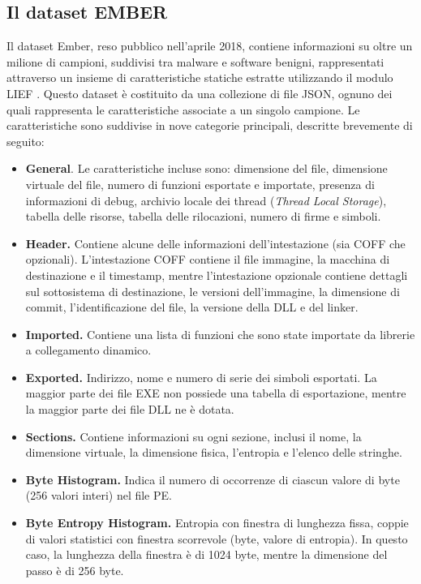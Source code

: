 \subsection{Il dataset EMBER}
Il dataset Ember, reso pubblico nell'aprile 2018, contiene informazioni su oltre un milione di campioni, suddivisi tra malware e software benigni, rappresentati attraverso un insieme di caratteristiche statiche estratte utilizzando il modulo LIEF \cite{lief}. Questo dataset è costituito da una collezione di file JSON, ognuno dei quali rappresenta le caratteristiche associate a un singolo campione. Le caratteristiche sono suddivise in nove categorie principali, descritte brevemente di seguito:
\begin{itemize}
	\item \textbf{General}. Le caratteristiche incluse sono: dimensione del file, dimensione virtuale del file, numero di funzioni esportate e importate, presenza di informazioni di debug, archivio locale dei thread (\textit{Thread Local Storage}), tabella delle risorse, tabella delle rilocazioni, numero di firme e simboli.
	\item \textbf{Header.} Contiene alcune delle informazioni dell'intestazione (sia COFF che opzionali). L'intestazione COFF contiene il file immagine, la macchina di destinazione e il timestamp, mentre l'intestazione opzionale contiene dettagli sul sottosistema di destinazione, le versioni dell'immagine, la dimensione di commit, l'identificazione del file, la versione della DLL e del linker.
	\item \textbf{Imported.} Contiene una lista di funzioni che sono state importate da librerie a collegamento dinamico.
	\item \textbf{Exported.} Indirizzo, nome e numero di serie dei simboli esportati. La maggior parte dei file EXE non possiede una tabella di esportazione, mentre la maggior parte dei file DLL ne è dotata.
	\item \textbf{Sections.} Contiene informazioni su ogni sezione, inclusi il nome, la dimensione virtuale, la dimensione fisica, l'entropia e l'elenco delle stringhe.
	\item \textbf{Byte Histogram.} Indica il numero di occorrenze di ciascun valore di byte (256 valori interi) nel file PE.
	\item \textbf{Byte Entropy Histogram.} Entropia con finestra di lunghezza fissa, coppie di valori statistici con finestra scorrevole (byte, valore di entropia). In questo caso, la lunghezza della finestra è di 1024 byte, mentre la dimensione del passo è di 256 byte.

\end{itemize}
